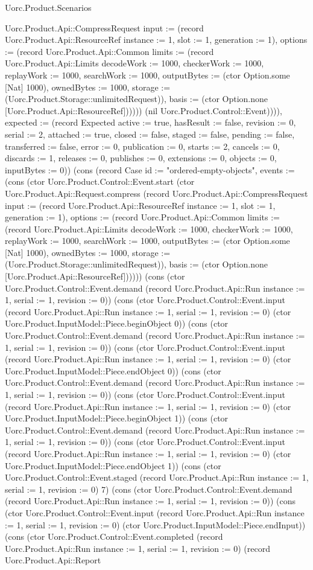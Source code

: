 \begin{lexlean}{Uorc.Product.Scenarios}
\begin{semanticmodule}
{Uorc.Product.Api::CompressRequest {input := (record Uorc.Product.Api::ResourceRef {instance := 1, slot := 1, generation := 1}), options := (record Uorc.Product.Api::Common {limits := (record Uorc.Product.Api::Limits {decodeWork := 1000, checkerWork := 1000, replayWork := 1000, searchWork := 1000, outputBytes := (ctor Option.some [Nat] 1000), ownedBytes := 1000, storage := (Uorc.Product.Storage::unlimitedRequest)}), basis := (ctor Option.none [Uorc.Product.Api::ResourceRef])})}))) (nil Uorc.Product.Control::Event)))), expected := (record Expected {active := true, hasResult := false, revision := 0, serial := 2, attached := true, closed := false, staged := false, pending := false, transferred := false, error := 0, publication := 0, starts := 2, cancels := 0, discards := 1, releases := 0, publishes := 0, extensions := 0, objects := 0, inputBytes := 0})}) (cons (record Case {id := "ordered-empty-objects", events := (cons (ctor Uorc.Product.Control::Event.start (ctor Uorc.Product.Api::Request.compress (record Uorc.Product.Api::CompressRequest {input := (record Uorc.Product.Api::ResourceRef {instance := 1, slot := 1, generation := 1}), options := (record Uorc.Product.Api::Common {limits := (record Uorc.Product.Api::Limits {decodeWork := 1000, checkerWork := 1000, replayWork := 1000, searchWork := 1000, outputBytes := (ctor Option.some [Nat] 1000), ownedBytes := 1000, storage := (Uorc.Product.Storage::unlimitedRequest)}), basis := (ctor Option.none [Uorc.Product.Api::ResourceRef])})}))) (cons (ctor Uorc.Product.Control::Event.demand (record Uorc.Product.Api::Run {instance := 1, serial := 1, revision := 0})) (cons (ctor Uorc.Product.Control::Event.input (record Uorc.Product.Api::Run {instance := 1, serial := 1, revision := 0}) (ctor Uorc.Product.InputModel::Piece.beginObject 0)) (cons (ctor Uorc.Product.Control::Event.demand (record Uorc.Product.Api::Run {instance := 1, serial := 1, revision := 0})) (cons (ctor Uorc.Product.Control::Event.input (record Uorc.Product.Api::Run {instance := 1, serial := 1, revision := 0}) (ctor Uorc.Product.InputModel::Piece.endObject 0)) (cons (ctor Uorc.Product.Control::Event.demand (record Uorc.Product.Api::Run {instance := 1, serial := 1, revision := 0})) (cons (ctor Uorc.Product.Control::Event.input (record Uorc.Product.Api::Run {instance := 1, serial := 1, revision := 0}) (ctor Uorc.Product.InputModel::Piece.beginObject 1)) (cons (ctor Uorc.Product.Control::Event.demand (record Uorc.Product.Api::Run {instance := 1, serial := 1, revision := 0})) (cons (ctor Uorc.Product.Control::Event.input (record Uorc.Product.Api::Run {instance := 1, serial := 1, revision := 0}) (ctor Uorc.Product.InputModel::Piece.endObject 1)) (cons (ctor Uorc.Product.Control::Event.staged (record Uorc.Product.Api::Run {instance := 1, serial := 1, revision := 0}) 7) (cons (ctor Uorc.Product.Control::Event.demand (record Uorc.Product.Api::Run {instance := 1, serial := 1, revision := 0})) (cons (ctor Uorc.Product.Control::Event.input (record Uorc.Product.Api::Run {instance := 1, serial := 1, revision := 0}) (ctor Uorc.Product.InputModel::Piece.endInput)) (cons (ctor Uorc.Product.Control::Event.completed (record Uorc.Product.Api::Run {instance := 1, serial := 1, revision := 0}) (record Uorc.Product.Api::Report }
\end{semanticmodule}
\end{lexlean}
